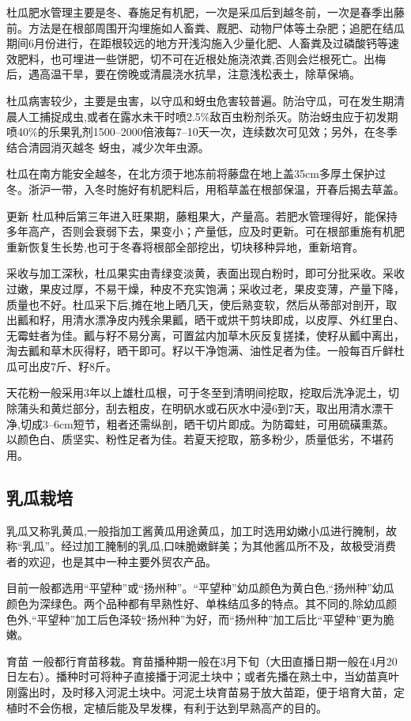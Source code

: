 \documentclass{ctexbook}
\begin{document}
杜瓜肥水管理主要是冬、春施足有机肥，一次是采瓜后到越冬前，一次是春季出藤前。方法是在根部周围开沟埋施如人畜粪、厩肥、动物尸体等土杂肥；追肥在结瓜期间6月份进行，在距根较远的地方开浅沟施入少量化肥、人畜粪及过磷酸钙等速效肥料，也可埋进一些饼肥，切不可在近根处施浇浓粪,否则会烂根死亡。出梅后，遇高温干旱，要在傍晚或清晨浇水抗旱，注意浅松表土，除草保墒。

杜瓜病害较少，主要是虫害，以守瓜和蚜虫危害较普遍。防治守瓜，可在发生期清晨人工捕捉成虫,或者在露水未干时喷2.5\%敌百虫粉剂杀灭。防治蚜虫应于初发期喷40\%的乐果乳剂1500--2000倍液每7--10天一次，连续数次可见效；另外，在冬季结合清园消灭越冬
蚜虫，减少次年虫源。

杜瓜在南方能安全越冬，在北方须于地冻前将藤盘在地上盖35cm多厚土保护过冬。浙沪一带，入冬时施好有机肥料后，用稻草盖在根部保温，开春后揭去草盖。

更新 杜瓜种后第三年进入旺果期，藤粗果大，产量高。若肥水管理得好，能保持多年高产，否则会衰弱下去，果变小；产量低，应及时更新。可在根部重施有机肥重新恢复生长势,也可于冬春将根部全部挖出，切块移种异地，重新培育。

采收与加工深秋，杜瓜果实由青绿变淡黄，表面出现白粉时，即可分批采收。采收过嫩，果皮过厚，不易干燥，种皮不充实饱满；采收过老，果皮变薄，产量下降，质量也不好。杜瓜采下后,摊在地上晒几天，使后熟变软，然后从蒂部对剖开，取出瓤和籽，用清水漂净皮内残余果瓤，晒干或烘干剪块即成，以皮厚、外红里白、无霉蛀者为佳。瓤与籽不易分离，可置盆内加草木灰反复搓揉，使籽从瓤中离出，淘去瓤和草木灰得籽，晒干即可。籽以干净饱满、油性足者为佳。一般每百斤鲜杜瓜可出皮7斤、籽8斤。

天花粉一般采用3年以上雄杜瓜根，可于冬至到清明间挖取，挖取后洗净泥土，切除蒲头和黄烂部分，刮去粗皮，在明矾水或石灰水中浸6到7天，取出用清水漂干净,切成3--6cm短节，粗者还需纵剖，晒干切片即成。为防霉蛀，可用硫磺熏蒸。以颜色白、质坚实、粉性足者为佳。若夏天挖取，筋多粉少，质量低劣，不堪药用。
\subsection{乳瓜栽培}
乳瓜又称乳黄瓜,一般指加工酱黄瓜用途黄瓜，加工时选用幼嫩小瓜进行腌制，故称“乳瓜”。经过加工腌制的乳瓜,口味脆嫩鲜美；为其他酱瓜所不及，故极受消费者的欢迎，也是其中一种主要外贸农产品。

目前一般都选用“平望种”或“扬州种”。“平望种”幼瓜颜色为黄白色,“扬州种”幼瓜颜色为深绿色。两个品种都有早熟性好、单株结瓜多的特点。其不同的,除幼瓜颜色外,“平望种”加工后色泽较“扬州种”为好，而“扬州种”加工后比“平望种”更为脆嫩。

育苗 一般都行育苗移栽。育苗播种期一般在3月下旬（大田直播日期一般在4月20日左右）。播种时可将种子直接播于河泥土块中；或者先播在熟土中，当幼苗真叶刚露出时，及时移入河泥土块中。河泥土块育苗易于放大苗距，便于培育大苗，定植时不会伤根，定植后能及早发棵，有利于达到早熟高产的目的。
\end{document}
